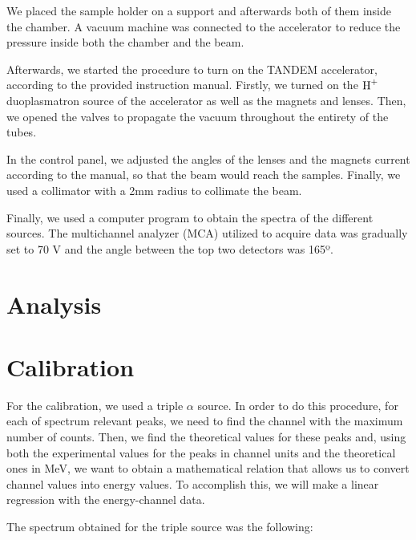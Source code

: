 \documentclass{article}
\begin{document}
\begin{multicols}{2}
We placed the sample holder on a support and afterwards both of them inside the chamber. A vacuum machine was connected to the accelerator to reduce the pressure inside both the chamber and the beam.

Afterwards, we started the procedure to turn on the TANDEM accelerator, according to the provided instruction manual. Firstly, we turned on the $\ce{H^+}$ duoplasmatron source of the accelerator as well as the magnets and lenses. Then, we opened the valves to propagate the vacuum throughout the entirety of the tubes.

In the control panel, we adjusted the angles of the lenses and the magnets current according to the manual, so that the beam would reach the samples. Finally, we used a collimator with a 2mm radius to collimate the beam. 

Finally, we used a computer program to obtain the spectra of the different sources. The multichannel analyzer (MCA) utilized to acquire data was gradually set to 70 V and the angle between the top two detectors was 165º. 

\section*{Analysis}

\section{Calibration}
    \label{sec:calibration}

For the calibration, we used a triple $\alpha$ source. 
In order to do this procedure, for each of spectrum relevant peaks, we need to find the channel with the maximum number of counts.
Then, we find the theoretical values for these peaks and, using both the experimental values for the peaks in channel units and the theoretical ones in MeV, we want to obtain a mathematical relation that allows us to convert channel values into energy values.  
To accomplish this, we will make a linear regression with the energy-channel data. 

The spectrum obtained for the triple source was the following:


\end{multicols}
\end{document}
